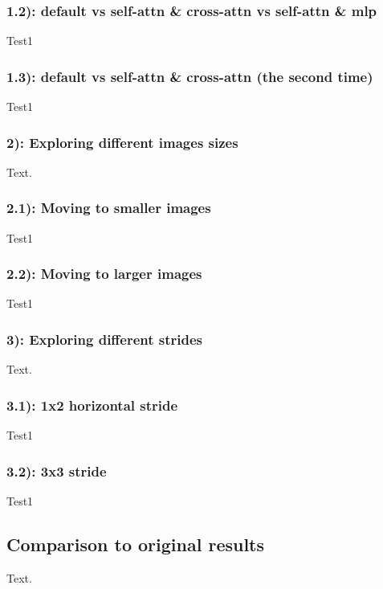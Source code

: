\newpage
\begin{figure}
    
    
    
    
\end{figure}
\subsubsection*{1.2): default vs self-attn \& cross-attn vs self-attn \& mlp}
Test1

\subsubsection*{1.3): default vs self-attn \& cross-attn (the second time)}
Test1

\newpage
\begin{figure}
    
    
\end{figure}
\subsubsection*{2): Exploring different images sizes}
Text.
\subsubsection*{2.1): Moving to smaller images}
Test1

\newpage
\subsubsection*{2.2): Moving to larger images}
Test1

\newpage
\subsubsection*{3): Exploring different strides}
Text.
\subsubsection*{3.1): 1x2 horizontal stride}
Test1
\subsubsection*{3.2): 3x3 stride}
Test1

\newpage
\subsection{Comparison to original results}
Text.